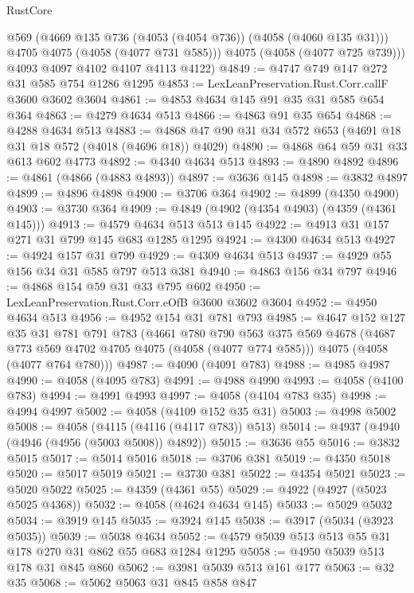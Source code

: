 \begin{lexlean}{RustCore}
\begin{coremodule}
          @569
          (@4669 @135 @736 (@4053 (@4054 @736)) (@4058 (@4060 @135 @31)))
          @4705
          @4075
          (@4058 (@4077 @731 @585)))
        @4075
        (@4058 (@4077 @725 @739)))
      @4093
      @4097
      @4102
      @4107
      @4113
      @4122)
@4849 := @4747 @749 @147 @272 @31 @585 @754 @1286 @1295
@4853 := LexLeanPreservation.Rust.Corr.callF @3600 @3602 @3604
@4861 := @4853 @4634 @145 @91 @35 @31 @585 @654 @364
@4863 := @4279 @4634 @513
@4866 := @4863 @91 @35 @654
@4868 := @4288 @4634 @513
@4883 := @4868 @47 @90 @31 @34 @572 @653 (@4691 @18 @31 @18 @572 (@4018 (@4696 @18)) @4029)
@4890 := @4868 @64 @59 @31 @33 @613 @602 @4773
@4892 := @4340 @4634 @513
@4893 := @4890 @4892
@4896 := @4861 (@4866 (@4883 @4893))
@4897 := @3636 @145
@4898 := @3832 @4897
@4899 := @4896 @4898
@4900 := @3706 @364
@4902 := @4899 (@4350 @4900)
@4903 := @3730 @364
@4909 := @4849 (@4902 (@4354 @4903) (@4359 (@4361 @145)))
@4913 := @4579 @4634 @513 @513 @145
@4922 := @4913 @31 @157 @271 @31 @799 @145 @683 @1285 @1295
@4924 := @4300 @4634 @513
@4927 := @4924 @157 @31 @799
@4929 := @4309 @4634 @513
@4937 := @4929 @55 @156 @34 @31 @585 @797 @513 @381
@4940 := @4863 @156 @34 @797
@4946 := @4868 @154 @59 @31 @33 @795 @602
@4950 := LexLeanPreservation.Rust.Corr.eOfB @3600 @3602 @3604
@4952 := @4950 @4634 @513
@4956 := @4952 @154 @31 @781 @793
@4985 := @4647
    @152
    @127
    @35
    @31
    @781
    @791
    @783
    (@4661
      @780
      @790
      @563
      @375
      @569
      @4678
      (@4687 @773 @569 @4702 @4705 @4075 (@4058 (@4077 @774 @585)))
      @4075
      (@4058 (@4077 @764 @780)))
@4987 := @4090 (@4091 @783)
@4988 := @4985 @4987
@4990 := @4058 (@4095 @783)
@4991 := @4988 @4990
@4993 := @4058 (@4100 @783)
@4994 := @4991 @4993
@4997 := @4058 (@4104 @783 @35)
@4998 := @4994 @4997
@5002 := @4058 (@4109 @152 @35 @31)
@5003 := @4998 @5002
@5008 := @4058 (@4115 (@4116 (@4117 @783)) @513)
@5014 := @4937 (@4940 (@4946 (@4956 (@5003 @5008)) @4892))
@5015 := @3636 @55
@5016 := @3832 @5015
@5017 := @5014 @5016
@5018 := @3706 @381
@5019 := @4350 @5018
@5020 := @5017 @5019
@5021 := @3730 @381
@5022 := @4354 @5021
@5023 := @5020 @5022
@5025 := @4359 (@4361 @55)
@5029 := @4922 (@4927 (@5023 @5025 @4368))
@5032 := @4058 (@4624 @4634 @145)
@5033 := @5029 @5032
@5034 := @3919 @145
@5035 := @3924 @145
@5038 := @3917 (@5034 (@3923 @5035))
@5039 := @5038 @4634
@5052 := @4579 @5039 @513 @513 @55 @31 @178 @270 @31 @862 @55 @683 @1284 @1295
@5058 := @4950 @5039 @513 @178 @31 @845 @860
@5062 := @3981 @5039 @513 @161 @177
@5063 := @32 @35
@5068 := @5062 @5063 @31 @845 @858 @847

\end{coremodule}
\end{lexlean}
